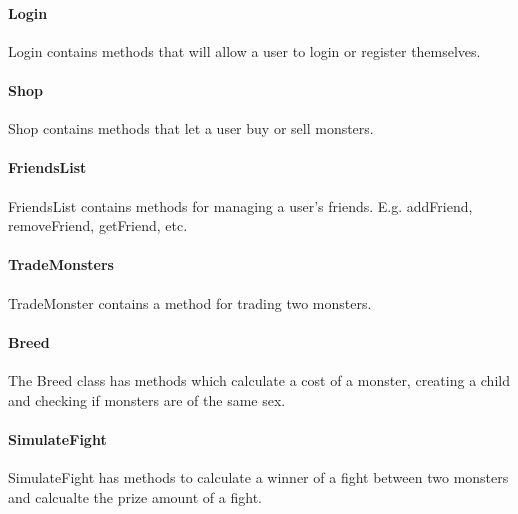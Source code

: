 	\paragraph{Login}
	Login contains methods that will allow a user to login or register themselves.
	\paragraph{Shop}
	Shop contains methods that let a user buy or sell monsters.
	\paragraph{FriendsList}
	FriendsList contains methods for managing a user's friends. E.g. addFriend, removeFriend, getFriend, etc.
	\paragraph{TradeMonsters}
	TradeMonster contains a method for trading two monsters.
	\paragraph{Breed}
	The Breed class has methods which calculate a cost of a monster, creating a child and checking if monsters are of the same sex.
	\paragraph{SimulateFight}
	SimulateFight has methods to calculate a winner of a fight between two monsters and calcualte the prize amount of a fight.

